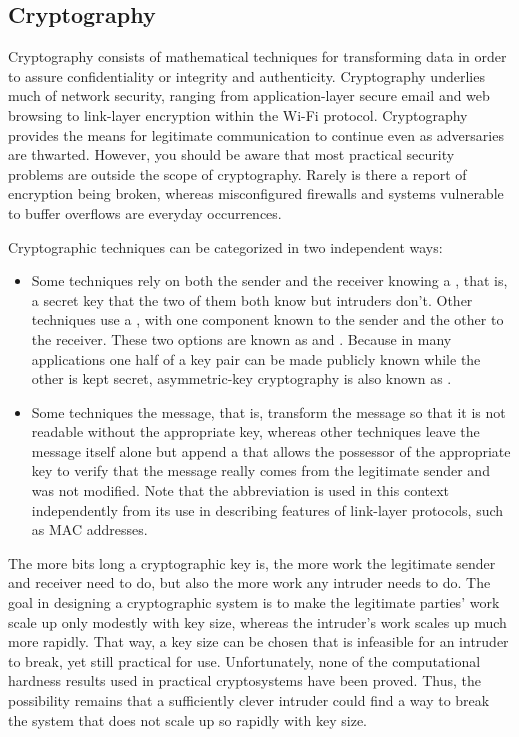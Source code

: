 \subsection{Cryptography}

Cryptography consists of mathematical techniques for transforming data
in order to assure confidentiality or integrity and authenticity.
Cryptography underlies much of network security, ranging from
application-layer secure email and web browsing to link-layer
encryption within the Wi-Fi protocol.  Cryptography provides the means
for legitimate communication to continue even as adversaries are
thwarted.  However, you should be aware that most practical security
problems are outside the scope of cryptography.  Rarely is there a
report of encryption being broken, whereas misconfigured
firewalls and systems vulnerable to buffer overflows are everyday
occurrences.

Cryptographic techniques can be categorized in two independent ways:
\begin{itemize}
\item
Some techniques rely on both the sender and the receiver knowing a
, that is, a secret key that the two of them
both know but intruders don't.  Other techniques use a , with one component known to the sender and the other to the
receiver.  These two options are known as
 and
.  Because in many
applications one half of a key pair can be made publicly known while
the other is kept secret, asymmetric-key cryptography is also known as
.
\item
Some techniques  the message, that is,
transform the message so that it is not readable
without the appropriate key, whereas other techniques leave the
message itself alone but append a 
that allows the possessor of the appropriate key to verify that the
message really comes from the legitimate sender and was not modified.
Note that the abbreviation  is used in this context independently
from its use in describing features of link-layer protocols, such as MAC
addresses.
\end{itemize}

The more bits long a cryptographic key is, the more work the
legitimate sender and receiver need to do, but also the more work any
intruder needs to do.  The goal in designing a cryptographic system is
to make the legitimate parties' work scale up only modestly with key
size, whereas the intruder's work scales up much more rapidly.  That
way, a key size can be chosen that is infeasible for an intruder to
break, yet still practical for use.  Unfortunately, none of the
computational hardness results used in practical cryptosystems have been proved.
Thus, the possibility remains that a sufficiently clever intruder
could find a way to break the system that does not scale up so rapidly
with key size.

